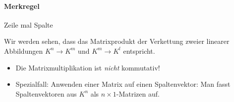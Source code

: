 \paragraph{Merkregel} Zeile mal Spalte

Wir werden sehen, dass das Matrixprodukt der Verkettung zweier linearer Abbildungen $K^n\rightarrow K^m$ und $K^m\rightarrow K^l$ entspricht.

\bemerkung
\begin{itemize}
	\item Die Matrixmultiplikation ist \emph{nicht} kommutativ!
	\item Spezialfall: Anwenden einer Matrix auf einen Spaltenvektor: Man fasst Spaltenvektoren aus $K^n$ als $n\times 1$-Matrizen auf.
\end{itemize}
